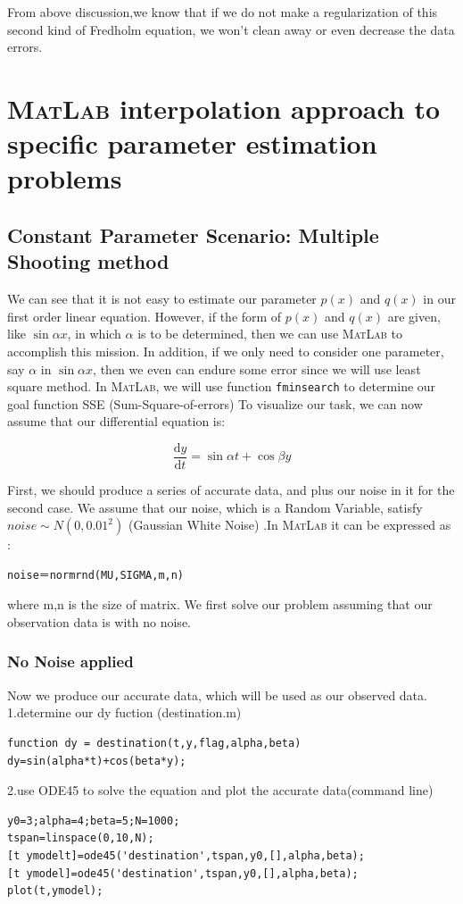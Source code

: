 \documentclass[a4paper]{article}
\begin{document}
From above discussion,we know that if we do not make a regularization of this
second kind of Fredholm equation, we won't clean away or even decrease the
data errors.
\newpage
\section{\textsc{MatLab} interpolation approach to specific parameter estimation problems}
\subsection{Constant Parameter Scenario: Multiple Shooting method}


We can see that it is not easy to estimate our parameter $p(x)$ and $q(x)$ in our first order linear equation. However, if the form of $p(x)$ and $q(x)$ are given, like $\sin \alpha x$, in which $\alpha$ is to be determined, then we can use \textsc{MatLab} to accomplish this mission. In addition, if we only need to consider one parameter, say $\alpha$ in $\sin \alpha x$, then we even can endure some error since we will use least square method.
In \textsc{MatLab}, we will use function \verb$fminsearch$ to determine our goal function SSE (Sum-Square-of-errors)
To visualize our task, we can now assume that our differential equation is:

\begin{equation}
\frac{\text{d}y}{\text{d}t}=\sin \alpha t+\cos \beta y
\end{equation}


First, we should produce a series of accurate data, and plus our noise in it for the second case. We assume that our noise, which is a Random Variable, satisfy $noise\sim N(0,{{0.01}^{2}})$ (Gaussian White Noise) .In \textsc{MatLab} it can be expressed as :
\begin{verbatim}
noise＝normrnd(MU,SIGMA,m,n)
\end{verbatim}
where m,n is the size of matrix. We first solve our problem assuming that our observation data is with no noise.

\subsubsection{No Noise applied}

Now we produce our accurate data, which will be used as our observed data.\\
1.determine our dy fuction (destination.m)
\begin{verbatim}
function dy = destination(t,y,flag,alpha,beta)
dy=sin(alpha*t)+cos(beta*y);
\end{verbatim}
2.use ODE45 to solve the equation and plot the accurate data(command line)
\begin{verbatim}
y0=3;alpha=4;beta=5;N=1000;
tspan=linspace(0,10,N);
[t ymodelt]=ode45('destination',tspan,y0,[],alpha,beta);
[t ymodel]=ode45('destination',tspan,y0,[],alpha,beta);
plot(t,ymodel);
\end{verbatim}
\end{document}
